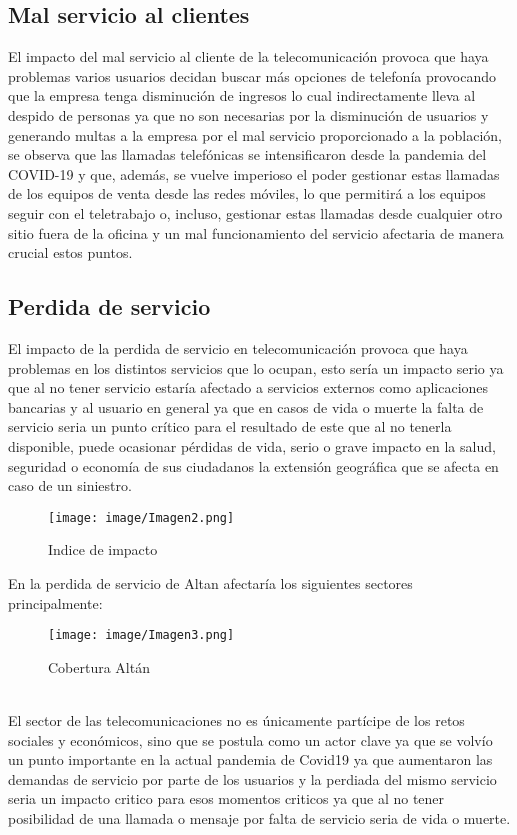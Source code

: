 \documentclass[conference]{IEEEtran}
\begin{document}
\subsection{Mal servicio al clientes}\label{AA}
El impacto del mal servicio al cliente de la telecomunicación provoca que haya problemas varios usuarios decidan buscar más opciones de telefonía provocando que la empresa tenga disminución de ingresos lo cual indirectamente lleva al despido de personas ya que no son necesarias por la disminución de usuarios y generando multas a la empresa por el mal servicio proporcionado a la población, se observa que las llamadas telefónicas se intensificaron desde la pandemia del COVID-19 y que, además, se vuelve imperioso el poder gestionar estas llamadas de los equipos de venta desde las redes móviles, lo que permitirá a los equipos seguir con el teletrabajo o, incluso, gestionar estas llamadas desde cualquier otro sitio fuera de la oficina y un mal funcionamiento del servicio afectaria de manera crucial estos puntos.

\subsection{Perdida de servicio}
El impacto de la perdida de servicio en telecomunicación provoca que haya problemas en los distintos servicios que lo ocupan, esto sería un impacto serio ya que al no tener servicio estaría afectado a servicios externos como aplicaciones bancarias y al usuario en general ya que en casos de vida o muerte la falta de servicio seria un punto crítico para el resultado de este que al no
tenerla disponible, puede ocasionar pérdidas de vida, serio o grave impacto en la salud, seguridad o economía de sus ciudadanos la extensión geográfica que se afecta en caso de un siniestro.

\begin{figure}[htbp]
    \begin{center}
    \texttt{[image: image/Imagen2.png]}
    \caption{Indice de impacto}
\label{fig1}
    \end{center}
\end{figure} 
En la perdida de servicio de Altan afectaría los siguientes sectores principalmente:
\begin{figure}[htbp]
    \begin{center}
    \texttt{[image: image/Imagen3.png]}
    \caption{Cobertura Altán}
\label{fig1}
    \end{center}
\end{figure} 
\\
El sector de las telecomunicaciones no es únicamente partícipe de los retos sociales y económicos, sino que se postula como un actor clave ya que se volvío un punto importante en la actual pandemia de Covid19 ya que aumentaron las demandas de servicio por parte de los usuarios y la perdiada del mismo servicio seria un impacto critico para esos momentos criticos ya que al no tener posibilidad de una llamada o mensaje por falta de servicio seria de vida o muerte.
\end{document}
